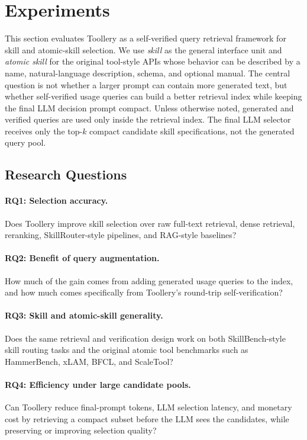 \section{Experiments}
\label{sec:experiments}

This section evaluates Toollery as a self-verified query retrieval framework for
skill and atomic-skill selection. We use
\emph{skill} as the general interface unit and \emph{atomic skill} for the original
tool-style APIs whose behavior can be described by a name, natural-language
description, schema, and optional manual. The central question is not whether a
larger prompt can contain more generated text, but whether self-verified usage
queries can build a better retrieval index while keeping the final LLM decision
prompt compact. Unless otherwise noted, generated and verified queries are used
only inside the retrieval index. The final LLM selector receives only the top-$k$
compact candidate skill specifications, not the generated query pool.

\subsection{Research Questions}
\label{subsec:rq}

\paragraph{RQ1: Selection accuracy.}
Does Toollery improve skill selection over raw full-text retrieval, dense
retrieval, reranking, SkillRouter-style pipelines, and RAG-style baselines?

\paragraph{RQ2: Benefit of query augmentation.}
How much of the gain comes from adding generated usage queries to the index, and
how much comes specifically from Toollery's round-trip self-verification?

\paragraph{RQ3: Skill and atomic-skill generality.}
Does the same retrieval and verification design work on both SkillBench-style
skill routing tasks and the original atomic tool benchmarks such as HammerBench,
xLAM, BFCL, and ScaleTool?

\paragraph{RQ4: Efficiency under large candidate pools.}
Can Toollery reduce final-prompt tokens, LLM selection latency, and monetary cost
by retrieving a compact subset before the LLM sees the candidates, while
preserving or improving selection quality?

